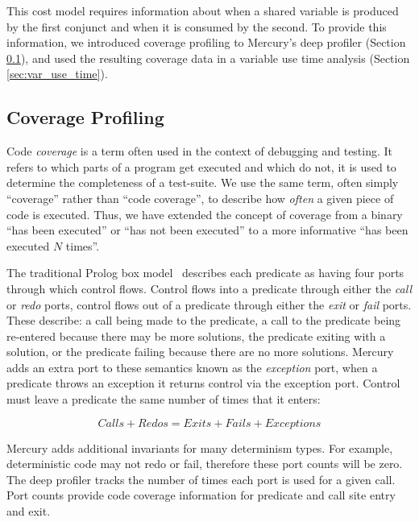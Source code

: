 This cost model requires information about when a shared variable is
produced by the first conjunct and when it is consumed by the second.
To provide this information,
we introduced coverage profiling to Mercury's deep profiler (Section
\ref{sec:coverage}),
and used the resulting coverage data in a variable use time analysis
(Section \ref{sec:var_use_time}).

\subsection{Coverage Profiling}
\label{sec:coverage}

Code \emph{coverage} is a term often used in the context of debugging and
testing.
It refers to which parts of a program get executed and which do not,
it is used to determine the completeness of a test-suite.
We use the same term,
often simply ``coverage'' rather than ``code coverage'',
to describe how \emph{often} a given piece of code is executed.
Thus, we have extended the concept of coverage from a binary ``has been
executed'' or ``has not been executed'' to a more informative
``has been executed $N$ times''.

The traditional Prolog box
model~\citep{box-model} describes each predicate
as having four ports through which control flows.
Control flows into a predicate through either the \emph{call} or
\emph{redo} ports,
control flows out of a predicate through either the \emph{exit} or
\emph{fail} ports.
These describe:
    a call being made to the predicate,
    a call to the predicate being re-entered because there may be more
    solutions,
    the predicate exiting with a solution,
    or the predicate failing because there are no more solutions.
Mercury adds an extra port to these semantics known as the
\emph{exception} port,
when a predicate throws an exception it returns control via the exception
port.
Control must leave a predicate the same number of times that it enters:

\begin{equation*}
Calls + Redos = Exits + Fails + Exceptions
\end{equation*}

\noindent
Mercury adds additional invariants for many determinism types.
For example, deterministic code may not redo or fail,
therefore these port counts will be zero.
The deep profiler tracks the number of times each port is used for a given
call.
Port counts provide code coverage information for predicate and call site
entry and exit.

